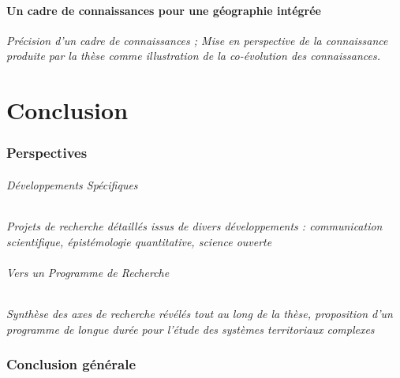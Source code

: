 \subsection{Un cadre de connaissances pour une géographie intégrée}

\textit{Précision d'un cadre de connaissances ; Mise en perspective de la connaissance produite par la thèse comme illustration de la co-évolution des connaissances.}



\part*{Conclusion}


\section*{Perspectives}

\paragraph{Développements Spécifiques}


\textit{Projets de recherche détaillés issus de divers développements : communication scientifique, épistémologie quantitative, science ouverte}


\paragraph{Vers un Programme de Recherche}

\textit{Synthèse des axes de recherche révélés tout au long de la thèse, proposition d'un programme de longue durée pour l'étude des systèmes territoriaux complexes}



\section*{Conclusion générale}



